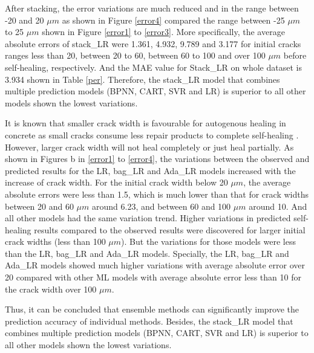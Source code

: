 \documentclass[11pt]{article}
\begin{document}
    After stacking, the error variations are much reduced and in the range between -20 and 20 $\mu m$ as shown in Figure \ref{error4} compared the range between -25 $\mu m$ to 25 $\mu m$ shown in Figure \ref{error1} to \ref{error3}. More specifically, the average absolute errors of stack\_LR were 1.361, 4.932, 9.789 and 3.177 for initial cracks ranges less than 20, between 20 to 60, between 60 to 100 and over 100 $\mu m$ before self-healing, respectively. And the MAE value for Stack\_LR on whole dataset is 3.934 shown in Table \ref{per}. Therefore, the stack\_LR model that combines multiple prediction models (BPNN, CART, SVR and LR) is superior to all other models shown the lowest variations. 
    
    
    It is known that smaller crack width is favourable for autogenous healing in concrete \cite{herbert2013selfhealing,liu2017influence} as small cracks consume less repair products to complete self-healing \cite{de2018review}. However, larger crack width will not heal completely or just heal partially. As shown in Figures b in \ref{error1} to \ref{error4}, the variations between the observed and predicted results for the LR, bag\_LR and Ada\_LR models increased with the increase of crack width. For the initial crack width below 20 $\mu m$, the average absolute errors were less than 1.5, which is much lower than that for crack widths between 20 and 60 $\mu m$ around 6.23, and between 60 and 100 $\mu m$ around 10. And all other models had the same variation trend. Higher variations in predicted self-healing results compared to the observed results were discovered for larger initial crack widths (less than 100 $\mu m$). But the variations for those models were less than the LR, bag\_LR and Ada\_LR models. Specially, the LR, bag\_LR and Ada\_LR models showed much higher variations with average absolute error over 20 compared with other ML models with average absolute error less than 10 for the crack width over 100 $\mu m$. 
    
    
    
    Thus, it can be concluded that ensemble methods can significantly improve the prediction accuracy of individual methods. Besides, the stack\_LR model that combines multiple prediction models (BPNN, CART, SVR and LR) is superior to all other models shown the lowest variations. 
	
	
\end{document}
